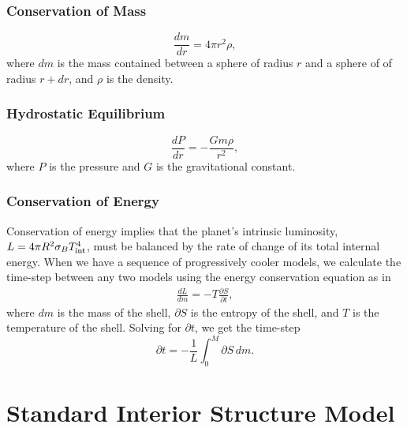 \documentclass[11pt]{ucscthesisbs}
\begin{document}
\subsubsection{Conservation of Mass}
\begin{equation}
  \frac{dm}{dr} =4 \pi r^{2}\rho  ,
\end{equation}
where $dm$ is the mass contained between a sphere of radius $r$ and a sphere of of radius $r + dr$, and $\rho$ is the density. 
\subsubsection{Hydrostatic Equilibrium}
\begin{equation}
  \frac{dP}{dr} = -\frac{Gm\rho}{r^{2}}  ,
\end{equation}
where $P$ is the pressure and $G$ is the gravitational constant. 
\subsubsection{Conservation of Energy}
Conservation of energy implies that the planet's intrinsic luminosity, $L = 4\pi R^2\sigma_{B}T_{\rm int}^4$, 
must be balanced by the rate of change of its total internal energy. When we have a sequence of progressively cooler models, we calculate the time-step between any two models using the energy conservation equation as in \citep{fortney_2011}
\begin{align}
\frac{dL}{dm}= -T\frac{\partial S}{\partial t},
\label{eq:energy_conservation}
\end{align}
where $dm$ is the mass of the shell, $\partial S$ is the entropy of the shell, and $T$ is the temperature of the shell. Solving for $\partial t$, we get the time-step
\begin{equation}
\partial t = -\frac{1}{L} \int_{0}^{M} \partial S \,dm .
\label{eq:timestep}
\end{equation}

\section{Standard Interior Structure Model}
\end{document}

